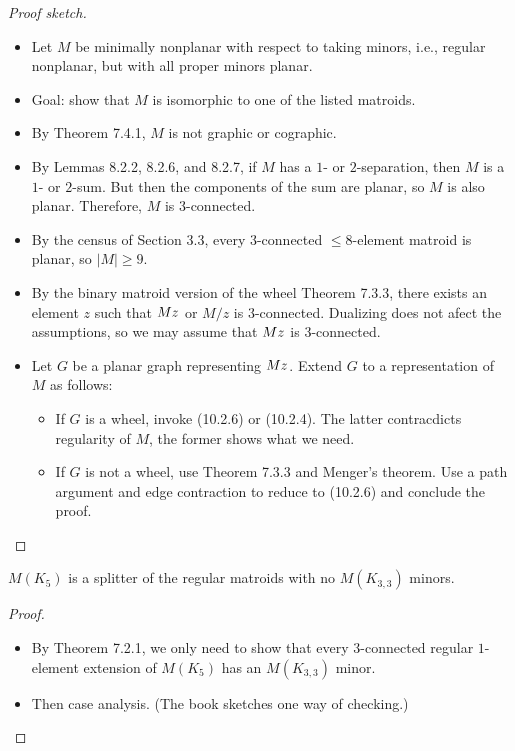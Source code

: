 \begin{proof}[Proof sketch]
  \begin{itemize}
    \item Let $M$ be minimally nonplanar with respect to taking minors, i.e., regular nonplanar, but with all proper minors planar.
    \item Goal: show that $M$ is isomorphic to one of the listed matroids.
    \item By Theorem 7.4.1, $M$ is not graphic or cographic.
    \item By Lemmas 8.2.2, 8.2.6, and 8.2.7, if $M$ has a $1$- or $2$-separation, then $M$ is a $1$- or $2$-sum. But then the components of the sum are planar, so $M$ is also planar. Therefore, $M$ is $3$-connected.
    \item By the census of Section 3.3, every $3$-connected $\leq 8$-element matroid is planar, so $|M| \geq 9$.
    \item By the binary matroid version of the wheel Theorem 7.3.3, there exists an element $z$ such that $M \\ z$ or $M / z$ is $3$-connected. Dualizing does not afect the assumptions, so we may assume that $M \\ z$ is $3$-connected.
    \item Let $G$ be a planar graph representing $M \\ z$. Extend $G$ to a representation of $M$ as follows:
    \begin{itemize}
      \item If $G$ is a wheel, invoke (10.2.6) or (10.2.4). The latter contracdicts regularity of $M$, the former shows what we need.
      \item If $G$ is not a wheel, use Theorem 7.3.3 and Menger's theorem. Use a path argument and edge contraction to reduce to (10.2.6) and conclude the proof.
    \end{itemize}
  \end{itemize}
\end{proof}

\begin{lemma}[10.3.1]
  \label{lem:10.3.1}
  $M(K_5)$ is a splitter of the regular matroids with no $M(K_{3,3})$ minors.
\end{lemma}

\begin{proof}
  \begin{itemize}
    \item By Theorem 7.2.1, we only need to show that every $3$-connected regular $1$-element extension of $M(K_5)$ has an $M(K_{3,3})$ minor.
    \item Then case analysis. (The book sketches one way of checking.)
  \end{itemize}
\end{proof}

